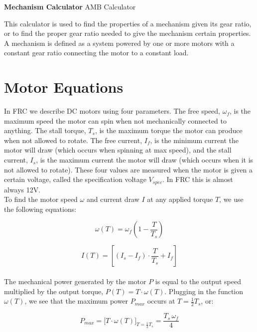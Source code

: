 \documentclass[a4paper]{article}
\begin{document}
	
	\Huge\textbf{Mechanism Calculator}
	\newline
	\LARGE AMB Calculator
	
	\vspace{0.5cm}
	\normalsize
	
	This calculator is used to find the properties of a mechanism given its gear ratio, or to find the proper gear ratio needed to give the mechanism certain properties. A mechanism is defined as a system powered by one or more motors with a constant gear ratio connecting the motor to a constant load. 
	
	\section{Motor Equations}
	
	In FRC we describe DC motors using four parameters. The free speed, $ \omega_f $, is the maximum speed the motor can spin when not mechanically connected to anything. The stall torque, $ T_s $, is the maximum torque the motor can produce when not allowed to rotate. The free current, $ I_f $, is the minimum current the motor will draw (which occurs when spinning at max speed), and the stall current, $ I_s $, is the maximum current the motor will draw (which occurs when it is not allowed to rotate). These four values are measured when the motor is given a certain voltage, called the specification voltage $ V_{spec} $. In FRC this is almost always 12V. \\
	
	To find the motor speed $ \omega $ and current draw $ I $ at any applied torque $ T $, we use the following equations:
	
	\begin{equation} \label{w(T)}
		\omega (T) = \omega_f \left( 1 - \frac{T}{T_s} \right)
	\end{equation}
	
	\begin{equation} \label{I(T)}
		I (T) = \left[ \left( I_s - I_f \right) \cdot \frac{T}{T_s} + I_f \right]
	\end{equation}\\
	
	The mechanical power generated by the motor $ P $ is equal to the output speed multiplied by the output torque, $ P(T) = T \cdot \omega (T) $. Plugging in the function $ \omega (T) $, we see that the maximum power $ P_{max} $ occurs at $ T = \frac{1}{2} T_s $, or:
	
	\begin{equation}
		P_{max} = \Big[ T \cdot \omega(T) \Big]_{T = \frac{1}{2} T_s} = \frac{T_s\, \omega_f}{4}
	\end{equation}\\
	
\end{document}
